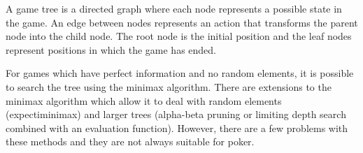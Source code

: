 


A game tree is a directed graph where each node represents a possible state in the game. An edge between nodes represents an action that transforms the parent node into the child node. The root node is the initial position and the leaf nodes represent positions in which the game has ended.

For games which have perfect information and no random elements, it is possible to search the tree using the minimax algorithm. 
There are extensions to the minimax algorithm which allow it to deal with random elements (expectiminimax) and larger trees (alpha-beta pruning or limiting depth search combined with an evaluation function).
However, there are a few problems with these methods and they are not always suitable for poker. 






